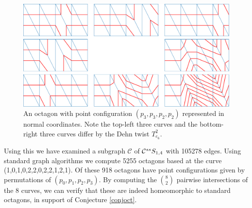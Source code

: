 \begin{figure}[h!]
  \centering
  \includegraphics[width=\textwidth]{figures/oct/oct3322.pdf}
  \caption{An octagon with point configuration $(p_3,p_3,p_2,p_2)$ represented in normal coordinates.
  Note the top-left three curves and the bottom-right
  three curves differ by the Dehn twist $T^2_{e_6}$.}
  \label{fig:3322oct}
\end{figure}

Using this we have examined a subgraph $\mathcal C$ of $ \mathcal C^{{ss}}  S_{1,4}$
with 105278 edges.
Using standard graph algorithms
we compute
5255 octagons based
at the curve (1,0,1,0,2,2,0,2,2,1,2,1).
Of these 918 octagons have point configurations given by permutations of $(p_0,p_1,p_2,p_3)$.
By computing the $\binom 8 2$ pairwise intersections of the 8 curves, we can verify that these are indeed homeomorphic to
standard octagons, in support of Conjecture \ref{conjoct}.

%
%
%
%
%
%
%
%
%
%
%


